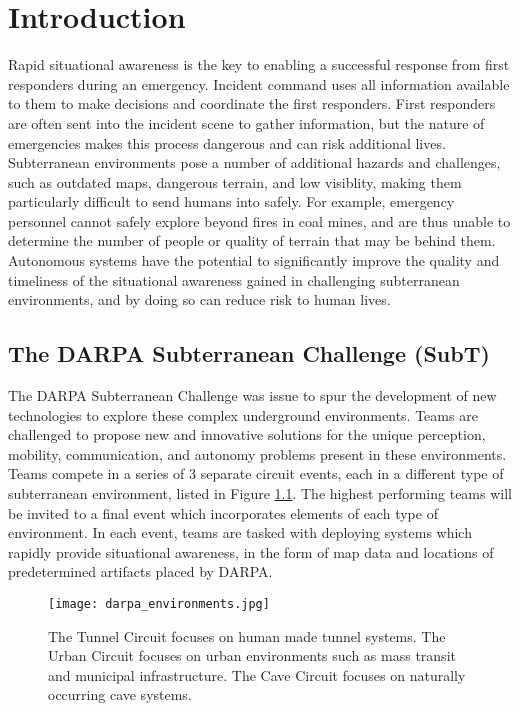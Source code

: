 \chapter{Introduction}

Rapid situational awareness is the key to enabling a successful response from first responders during an emergency. Incident command uses all information available to them to make decisions and coordinate the first responders. First responders are often sent into the incident scene to gather information, but the nature of emergencies makes this process dangerous and can risk additional lives. Subterranean environments pose a number of additional hazards and challenges, such as outdated maps, dangerous terrain, and low visiblity, making them particularly difficult to send humans into safely. For example, emergency personnel cannot safely explore beyond fires in coal mines, and are thus unable to determine the number of people or quality of terrain that may be behind them. Autonomous systems have the potential to significantly improve the quality and timeliness of the situational awareness gained in challenging subterranean environments, and by doing so can reduce risk to human lives.


\section{The DARPA Subterranean Challenge (SubT)}

The DARPA Subterranean Challenge was issue to spur the development of new technologies to explore these complex underground environments. Teams are challenged to propose new and innovative solutions for the unique perception, mobility, communication, and autonomy problems present in these environments. Teams compete in a series of 3 separate circuit events, each in a different type of subterranean environment, listed in Figure \ref{darpa_environments}. The highest performing teams will be invited to a final event which incorporates elements of each type of environment. In each event, teams are tasked with deploying systems which rapidly provide situational awareness, in the form of map data and locations of predetermined artifacts placed by DARPA.

\begin{figure}	
	\centering
	\texttt{[image: darpa\_environments.jpg]}
	\caption[DARPA Subterranean Challenge environments]{The Tunnel Circuit focuses on human made tunnel systems. The Urban Circuit focuses on urban environments such as mass transit and municipal infrastructure. The Cave Circuit focuses on naturally occurring cave systems.}
	\label{darpa_environments}
\end{figure}

